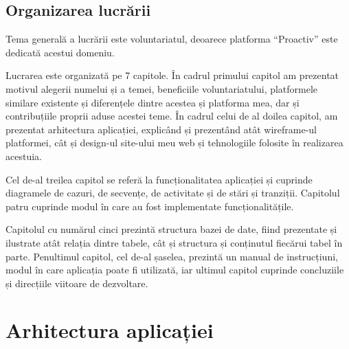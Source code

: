 \documentclass[12pt,a4paper]{report}
\begin{document}
\section{Organizarea lucrării}
\par
Tema generală a lucrării este voluntariatul, deoarece platforma “Proactiv” este dedicată acestui domeniu.
\\\par 
Lucrarea este organizată pe 7 capitole. În cadrul primului capitol am prezentat motivul alegerii numelui și a temei, beneficiile voluntariatului, platformele similare existente și diferențele dintre acestea și platforma mea, dar și contribuțiile proprii aduse acestei teme. În cadrul celui de al doilea capitol, am prezentat arhitectura aplicației, explicând și prezentând atât wireframe-ul platformei, cât și design-ul site-ului meu web și tehnologiile folosite în realizarea acestuia.
\\\par 
Cel de-al treilea capitol se referă la funcționalitatea aplicației și cuprinde diagramele de cazuri, de secvențe, de activitate și de stări și tranziții. Capitolul patru cuprinde modul în care au fost implementate funcționalitățile.
\\\par 
Capitolul cu numărul cinci prezintă structura bazei de date, fiind prezentate și ilustrate atât relația dintre tabele, cât și structura și conținutul fiecărui tabel în parte. Penultimul capitol, cel de-al șaselea, prezintă un manual de instrucțiuni, modul în care aplicația poate fi utilizată, iar ultimul capitol cuprinde concluziile și direcțiile viitoare de dezvoltare.


\chapter{Arhitectura aplicației}
\end{document}
